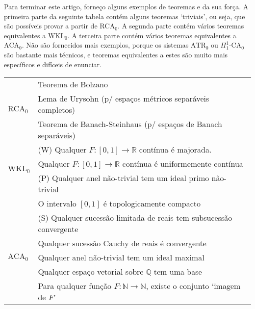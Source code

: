 Para terminar este artigo, forneço alguns exemplos de teoremas e da sua força. A primeira parte da seguinte tabela contém alguns teoremas `triviais', ou seja, que são possíveis provar a partir de $\mathrm{RCA}_0$. A segunda parte contém vários teoremas equivalentes a $\mathrm{WKL}_0$. A terceira parte contém vários teoremas equivalentes a $\mathrm{ACA}_0$. Não são fornecidos mais exemplos, porque os sistemas $\mathrm{ATR}_0$ ou $\Pi^1_1\text{-}\mathrm{CA}_0$ são bastante mais técnicos, e teoremas equivalentes a estes são muito mais específicos e difíceis de enunciar.
\bgroup
\def\arraystretch{1.25}
\begin{table}[H]
\centering
\begin{tabular}{|l|l|}
\hline
\multirow{3}{*}{$\mathrm{RCA}_0$} & Teorema de Bolzano \\ \cline{2-2} 
                         & Lema de Urysohn (p/ espaços métricos separáveis completos) \\ \cline{2-2} 
                         & Teorema de Banach-Steinhaus (p/ espaços de Banach separáveis) \\ \hline
\multirow{3}{*}{$\mathrm{WKL}_0$}        & (W) Qualquer $F \colon [0,1] \to \mathbb{R}$ contínua é majorada. \\ \cline{2-2} 
                         & Qualquer $F \colon [0,1] \to \mathbb{R}$ contínua é uniformemente contínua \\ \cline{2-2} 
                         & (P) Qualquer anel não-trivial tem um ideal primo não-trivial \\ \cline{2-2} 
                         & O intervalo $[0,1]$ é topologicamente compacto \\ \hline
\multirow{5}{*}{$\mathrm{ACA}_0$}        & (S) Qualquer sucessão limitada de reais tem subsucessão convergente \\ \cline{2-2} 
                         & Qualquer sucessão Cauchy de reais é convergente \\ \cline{2-2} 
                         & Qualquer anel não-trivial tem um ideal maximal \\ \cline{2-2} 
                         & Qualquer espaço vetorial sobre $\mathbb{Q}$ tem uma base \\ \cline{2-2} 
                         & Para qualquer função $F \colon \mathbb{N} \to \mathbb{N}$, existe o conjunto `imagem de $F$' \\ \hline
\end{tabular}
\end{table}
\egroup